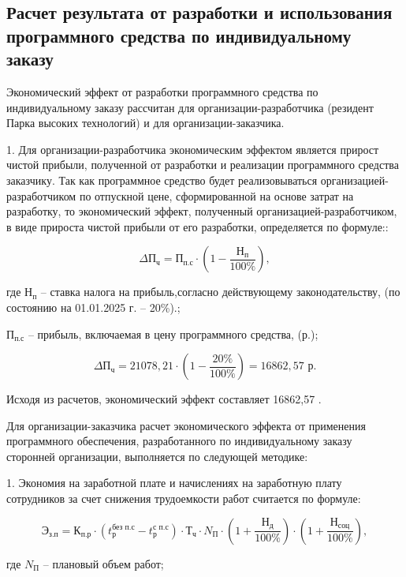 \subsection{Расчет результата от разработки и использования программного средства по индивидуальному заказу}

Экономический эффект от разработки программного средства по индивидуальному заказу рассчитан для организации-разработчика (резидент Парка высоких технологий) и для организации-заказчика.

1. Для организации-разработчика экономическим эффектом является прирост чистой прибыли, полученной от разработки и реализации программного средства заказчику. Так как программное средство будет реализовываться организацией-разработчиком по отпускной цене, сформированной на основе затрат на разработку, то экономический эффект, полученный организацией-разработчиком, в виде прироста чистой прибыли от его разработки, определяется по формуле::

$$
	\text{$\Delta$П}_{\text{ч}} = \text{П}_{\text{п.с}} \cdot (1 - \frac{\text{Н}_{\text{п}} }{100\%}),
$$

где $\text{Н}_{\text{п}}$ -- ставка налога на прибыль,согласно действующему законодательству, (по состоянию на 01.01.2025 г. – 	20\%).;

$\text{П}_{\text{п.с}}$ -- прибыль, включаемая в цену программного средства, (р.);

$$
	\text{$\Delta$П}_{\text{ч}} = 21078,21 \cdot (1 - \frac{20\%}{100\%}) = 16862,57 \text{ р}.
$$

Исходя из расчетов, экономический эффект составляет 16862,57 .


Для организации-заказчика расчет экономического эффекта от применения программного обеспечения, разработанного по индивидуальному заказу сторонней организации, выполняется по следующей методике:

1. Экономия на заработной плате и начислениях на заработную плату сотрудников за счет снижения трудоемкости работ считается по формуле:


\begin{equation}
	\text{Э}_{\text{з.п}} = \text{К}_{\text{п.р}}\cdot (t^{\text{без п.с}}_{\text{р}}-t^{\text{с п.с}}_{\text{р}})\cdot \text{Т}_{\text{ч}}\cdot N_{\text{П}}\cdot  (1+\frac{\text{Н}_{\text{д}}}{100\%})\cdot (1+\frac{\text{Н}_{\text{соц}}}{100\%}),
\end{equation}

где $N_{\text{П}}$ -- плановый объем работ;

